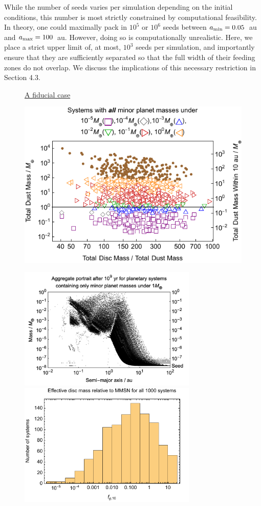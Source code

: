 \documentclass[useAMS,usenatbib]{mn2e}
\newcommand{\rev}{ }
\begin{document}
While the number of seeds varies per simulation depending on the initial conditions, this number is most strictly constrained by computational feasibility. In theory, one could maximally pack in $10^5$ or $10^6$ seeds between $a_{\rm min} = 0.05$~au and $a_{\rm max} = 100$~au. However, doing so is computationally unrealistic. Here, we place a strict upper limit of, at most, $10^3$ seeds per simulation, and importantly ensure that they are sufficiently separated so that the full width of their feeding zones do not overlap. {\rev We discuss the implications of this necessary restriction in Section 4.3.}




\begin{figure}
\centerline{\Huge \underline{A fiducial case}}
\centerline{}
\centerline{}
\centerline{
\includegraphics[width=17cm]{PlotFinalPunch}
}
\centerline{}
\centerline{
\includegraphics[width=8.5cm]{PlotSemiPlot}
\includegraphics[width=8.5cm]{FValues}
}
\end{figure}
\end{document}
